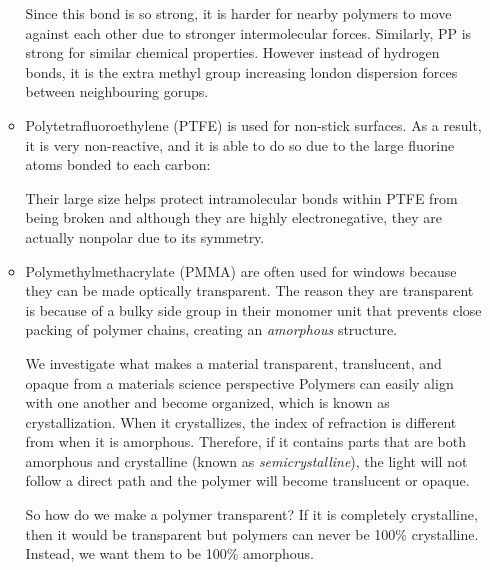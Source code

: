 \begin{itemize}
\begin{itemize}
\begin{case}
        Since this bond is so strong, it is harder for nearby polymers to move against each other due to stronger intermolecular forces. Similarly, PP is strong for similar chemical properties. However instead of hydrogen bonds, it is the extra methyl group increasing london dispersion forces between neighbouring gorups.
    \end{case}
    \item Polytetrafluoroethylene (PTFE) is used for non-stick surfaces. As a result, it is very non-reactive, and it is able to do so due to the large fluorine atoms bonded to each carbon:
    \begin{center}
    \end{center}
    Their large size helps protect intramolecular bonds within PTFE from being broken and although they are highly electronegative, they are actually nonpolar due to its symmetry.
    \item Polymethylmethacrylate (PMMA) are often used for windows because they can be made optically transparent. The reason they are transparent is because of a bulky side group in their monomer unit that prevents close packing of polymer chains, creating an \textit{amorphous} structure.
    \begin{center}
    \end{center}
    \begin{case}
        We investigate what makes a material transparent, translucent, and opaque from a materials science perspective Polymers can easily align with one another and become organized, which is known as crystallization. When it crystallizes, the index of refraction is different from when it is amorphous. Therefore, if it contains parts that are both amorphous and crystalline (known as \textit{semicrystalline}), the light will not follow a direct path and the polymer will become translucent or opaque.
        \vspace{2mm}

        So how do we make a polymer transparent? If it is completely crystalline, then it would be transparent but polymers can never be 100\% crystalline. Instead, we want them to be 100\% amorphous.
        \vspace{2mm}


\end{case}
\end{itemize}
\end{itemize}
